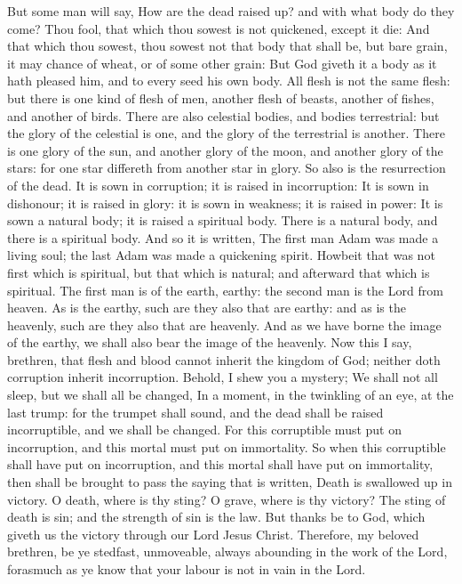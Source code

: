  But some man will say, How are the dead raised up? and
with what body do they come?  Thou fool, that which thou
sowest is not quickened, except it die:  And that which
thou sowest, thou sowest not that body that shall be, but bare grain, it
may chance of wheat, or of some other grain:  But God
giveth it a body as it hath pleased him, and to every seed his own body.
 All flesh is not the same flesh: but there is one kind of
flesh of men, another flesh of beasts, another of fishes, and another of
birds.  There are also celestial bodies, and bodies
terrestrial: but the glory of the celestial is one, and the glory of the
terrestrial is another.  There is one glory of the sun, and
another glory of the moon, and another glory of the stars: for one star
differeth from another star in glory.  So also is the
resurrection of the dead. It is sown in corruption; it is raised in
incorruption:  It is sown in dishonour; it is raised in
glory: it is sown in weakness; it is raised in power:  It
is sown a natural body; it is raised a spiritual body. There is a
natural body, and there is a spiritual body.  And so it is
written, The first man Adam was made a living soul; the last Adam was
made a quickening spirit.  Howbeit that was not first which
is spiritual, but that which is natural; and afterward that which is
spiritual.  The first man is of the earth, earthy: the
second man is the Lord from heaven.  As is the earthy, such
are they also that are earthy: and as is the heavenly, such are they
also that are heavenly.  And as we have borne the image of
the earthy, we shall also bear the image of the heavenly. 
Now this I say, brethren, that flesh and blood cannot inherit the
kingdom of God; neither doth corruption inherit incorruption.
 Behold, I shew you a mystery; We shall not all sleep, but
we shall all be changed,  In a moment, in the twinkling of
an eye, at the last trump: for the trumpet shall sound, and the dead
shall be raised incorruptible, and we shall be changed. 
For this corruptible must put on incorruption, and this mortal must put
on immortality.  So when this corruptible shall have put on
incorruption, and this mortal shall have put on immortality, then shall
be brought to pass the saying that is written, Death is swallowed up in
victory.  O death, where is thy sting? O grave, where is
thy victory?  The sting of death is sin; and the strength
of sin is the law.  But thanks be to God, which giveth us
the victory through our Lord Jesus Christ.  Therefore, my
beloved brethren, be ye stedfast, unmoveable, always abounding in the
work of the Lord, forasmuch as ye know that your labour is not in vain
in the Lord.

